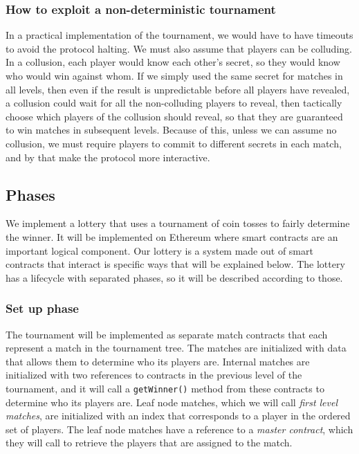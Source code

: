 \subsubsection{How to exploit a non-deterministic tournament}  %
In a practical implementation of the tournament, we would have to have timeouts to avoid the protocol halting. We must also assume that players can be colluding. In a collusion, each player would know each other's secret, so they would know who would win against whom. If we simply used the same secret for matches in all levels, then even if the result is unpredictable before all players have revealed, a collusion could wait for all the non-colluding players to reveal, then tactically choose which players of the collusion should reveal, so that they are guaranteed to win matches in subsequent levels. Because of this, unless we can assume no collusion, we must require players to commit to different secrets in each match, and by that make the protocol more interactive.

\subsection{Phases}

We implement a lottery that uses a tournament of coin tosses to fairly determine the winner. It will be implemented on Ethereum where smart contracts are an important logical component. Our lottery is a system made out of smart contracts that interact is specific ways that will be explained below. The lottery has a lifecycle with separated phases, so it will be described according to those.

\subsubsection{Set up phase}
The tournament will be implemented as separate match contracts that each represent a match in the tournament tree. The matches are initialized with data that allows them to determine who its players are. Internal matches are initialized with two references to contracts in the previous level of the tournament, and it will call a \texttt{getWinner()} method from these contracts to determine who its players are. Leaf node matches, which we will call \emph{first level matches}, are initialized with an index that corresponds to a player in the ordered set of players. The leaf node matches have a reference to a \emph{master contract}, which they will call to retrieve the players that are assigned to the match.

